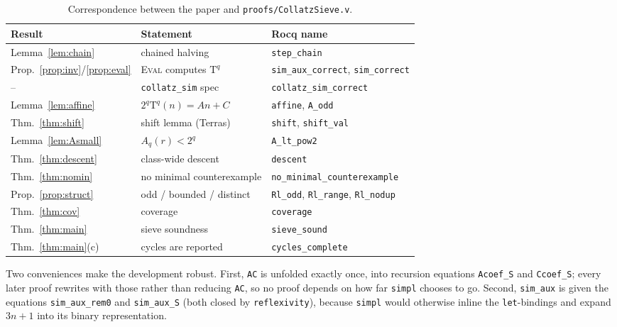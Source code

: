 \documentclass[11pt,a4paper]{article}
\theoremstyle{plain}
\theoremstyle{definition}
\newcommand{\Tmap}{\mathrm{T}}
\begin{document}
\begin{table}[htb]
\centering
\small
\begin{tabular}{@{}lll@{}}
\toprule
\textbf{Result} & \textbf{Statement} & \textbf{Rocq name} \\
\midrule
Lemma~\ref{lem:chain}      & chained halving              & \texttt{step\_chain} \\
Prop.~\ref{prop:inv}/\ref{prop:eval} & \textsc{Eval} computes $\Tmap^{q}$ & \texttt{sim\_aux\_correct}, \texttt{sim\_correct} \\
--                         & \texttt{collatz\_sim} spec   & \texttt{collatz\_sim\_correct} \\
Lemma~\ref{lem:affine}     & $2^{q}\Tmap^{q}(n) = A n + C$ & \texttt{affine}, \texttt{A\_odd} \\
Thm.~\ref{thm:shift}       & shift lemma (Terras)         & \texttt{shift}, \texttt{shift\_val} \\
Lemma~\ref{lem:Asmall}     & $A_{q}(r) < 2^{q}$           & \texttt{A\_lt\_pow2} \\
Thm.~\ref{thm:descent}     & class-wide descent           & \texttt{descent} \\
Thm.~\ref{thm:nomin}       & no minimal counterexample    & \texttt{no\_minimal\_counterexample} \\
Prop.~\ref{prop:struct}    & odd / bounded / distinct     & \texttt{Rl\_odd}, \texttt{Rl\_range}, \texttt{Rl\_nodup} \\
Thm.~\ref{thm:cov}         & coverage                     & \texttt{coverage} \\
Thm.~\ref{thm:main}        & sieve soundness              & \texttt{sieve\_sound} \\
Thm.~\ref{thm:main}(c)     & cycles are reported          & \texttt{cycles\_complete} \\
\bottomrule
\end{tabular}
\caption{Correspondence between the paper and \texttt{proofs/CollatzSieve.v}.}
\label{tab:map}
\end{table}

Two conveniences make the development robust. First, \texttt{AC} is unfolded
exactly once, into recursion equations \texttt{Acoef\_S} and
\texttt{Ccoef\_S}; every later proof rewrites with those rather than reducing
\texttt{AC}, so no proof depends on how far \texttt{simpl} chooses to go.
Second, \texttt{sim\_aux} is given the equations \texttt{sim\_aux\_rem0} and
\texttt{sim\_aux\_S} (both closed by \texttt{reflexivity}), because
\texttt{simpl} would otherwise inline the \texttt{let}-bindings and expand
$3n+1$ into its binary representation.
\end{document}
